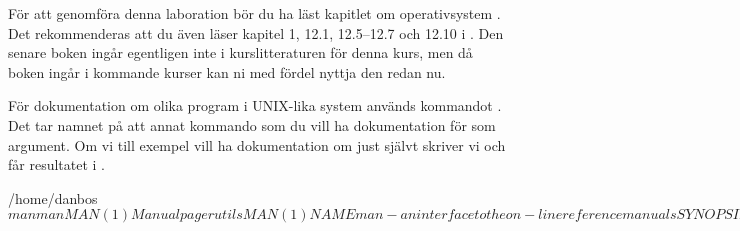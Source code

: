 För att genomföra denna laboration bör du ha läst kapitlet om operativsystem 
\citep[kapitel 3]{Brookshear2012csa}.
Det rekommenderas att du även läser kapitel 1, 12.1, 12.5--12.7 och 12.10 
i  \cite{nemeth2011ual}.
Den senare boken ingår egentligen inte i kurslitteraturen för denna kurs, men 
då boken ingår i kommande kurser kan ni med fördel nyttja den redan nu.

För dokumentation om olika program i UNIX-lika system används kommandot 
.
Det tar namnet på att annat kommando som du vill ha dokumentation för som 
argument.
Om vi till exempel vill ha dokumentation om just  självt skriver vi 
 och får resultatet i .
\begin{terminal}[float,label={lst:manman},caption={Listningen av resultatet vid 
  körningen av kommandot \term{man man}.}]
/home/danbos$ man man
MAN(1)						Manual pager utils						MAN(1)

NAME
	   man - an interface to the on-line reference manuals

SYNOPSIS
	   man  [-C  file]  [-d]  [-D]  [--warnings[=warnings]]  [-R encoding] [-L
	   locale] [-m system[,...]] [-M path] [-S list]  [-e  extension]  [-i|-I]
	   [--regex|--wildcard]   [--names-only]  [-a]  [-u]  [--no-subpages]  [-P
	   pager] [-r prompt] [-7] [-E encoding] [--no-hyphenation] [--no-justifi-
	   cation]  [-p  string]  [-t]  [-T[device]]  [-H[browser]] [-X[dpi]] [-Z]
	   [[section] page ...] ...
	   man -k [apropos options] regexp ...
	   man -K [-w|-W] [-S list] [-i|-I] [--regex] [section] term ...
	   man -f [whatis options] page ...
	   man -l [-C file] [-d] [-D] [--warnings[=warnings]]  [-R  encoding]  [-L
	   locale]  [-P  pager]  [-r  prompt]  [-7] [-E encoding] [-p string] [-t]
	   [-T[device]] [-H[browser]] [-X[dpi]] [-Z] file ...
	   man -w|-W [-C file] [-d] [-D] page ...
	   man -c [-C file] [-d] [-D] page ...
	   man [-hV]

DESCRIPTION
	   man is the system's manual pager. Each page argument given  to  man  is
	   normally  the  name of a program, utility or function.  The manual page
	   associated with each of these arguments is then found and displayed.  A
	   section,  if  provided, will direct man to look only in that section of
	   the manual.  The default action is to search in all  of  the  available
	   sections, following a pre-defined order and to show only the first page
	   found, even if page exists in several sections.

	   The table below shows the section numbers of the manual followed by the
	   types of pages they contain.
[...]
/home/danbos$
\end{terminal}
